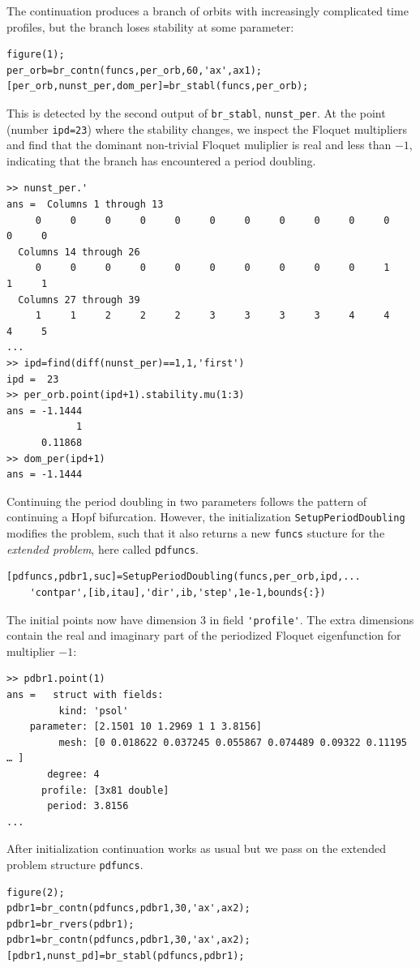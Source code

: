 \documentclass[10pt]{scrartcl}
\newcommand{\blist}[1]{\mbox{\lstinline!#1!}}
\begin{document}
The continuation produces a branch of orbits with increasingly complicated time profiles, but the branch loses stability at some parameter:
\begin{lstlisting}
figure(1);
per_orb=br_contn(funcs,per_orb,60,'ax',ax1);
[per_orb,nunst_per,dom_per]=br_stabl(funcs,per_orb);
\end{lstlisting}
This is detected by the second output of \blist{br_stabl}, \blist{nunst_per}. At the point (number \blist{ipd=23}) where the stability changes, we inspect the Floquet multipliers and find that the dominant non-trivial Floquet muliplier is real and less than $-1$, indicating that the branch has encountered a period doubling.
\begin{verbatim}
>> nunst_per.'
ans =  Columns 1 through 13
     0     0     0     0     0     0     0     0     0     0     0     0     0
  Columns 14 through 26
     0     0     0     0     0     0     0     0     0     0     1     1     1
  Columns 27 through 39
     1     1     2     2     2     3     3     3     3     4     4     4     5
...
>> ipd=find(diff(nunst_per)==1,1,'first')
ipd =  23
>> per_orb.point(ipd+1).stability.mu(1:3)
ans = -1.1444
            1
      0.11868
>> dom_per(ipd+1)
ans = -1.1444
\end{verbatim}
Continuing the period doubling in two parameters follows the pattern
of continuing a Hopf bifurcation. However, the initialization
\blist{SetupPeriodDoubling} modifies the problem, such that it also
returns a new \blist{funcs} stucture for the \emph{extended problem},
here called \blist{pdfuncs}.
\begin{lstlisting}
[pdfuncs,pdbr1,suc]=SetupPeriodDoubling(funcs,per_orb,ipd,...
    'contpar',[ib,itau],'dir',ib,'step',1e-1,bounds{:})
\end{lstlisting}
The initial points now have dimension $3$ in field \blist{'profile'}. The extra dimensions contain the real and imaginary part of the periodized Floquet eigenfunction for multiplier $-1$:
\begin{verbatim}
>> pdbr1.point(1)
ans =   struct with fields:
         kind: 'psol'
    parameter: [2.1501 10 1.2969 1 1 3.8156]
         mesh: [0 0.018622 0.037245 0.055867 0.074489 0.09322 0.11195 … ]
       degree: 4
      profile: [3x81 double]
       period: 3.8156
...
\end{verbatim}
After initialization continuation works as usual but we pass on the extended problem structure \blist{pdfuncs}.
\begin{lstlisting}
figure(2);
pdbr1=br_contn(pdfuncs,pdbr1,30,'ax',ax2);
pdbr1=br_rvers(pdbr1);
pdbr1=br_contn(pdfuncs,pdbr1,30,'ax',ax2);
[pdbr1,nunst_pd]=br_stabl(pdfuncs,pdbr1);
\end{lstlisting}
\end{document}
